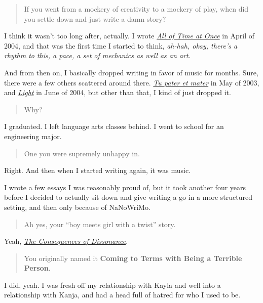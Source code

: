 \begin{quote}
If you went from a mockery of creativity to a mockery of play, when did you settle down and just write a damn story?
\end{quote}

I think it wasn't too long after, actually. I wrote \href{https://writing.drab-makyo.com/fiction/all-of-time-at-once/}{\emph{All of Time at Once}} in April of 2004, and that was the first time I started to think, \emph{ah-hah, okay, there's a rhythm to this, a pace, a set of mechanics as well as an art.}

And from then on, I basically dropped writing in favor of music for months. Sure, there were a few others scattered around there. \href{https://writing.drab-makyo.com/fiction/tu-pater-et-mater/}{\emph{Tu pater et mater}} in May of 2003, and \href{https://writing.drab-makyo.com/fiction/light/}{\emph{Light}} in June of 2004, but other than that, I kind of just dropped it.

\begin{quote}
Why?
\end{quote}

I graduated. I left language arts classes behind. I went to school for an engineering major.

\begin{quote}
One you were supremely unhappy in.
\end{quote}

Right. And then when I started writing again, it was music.

I wrote a few essays I was reasonably proud of, but it took another four years before I decided to actually sit down and give writing a go in a more structured setting, and then only because of NaNoWriMo.

\begin{quote}
Ah yes, your ``boy meets girl with a twist'' story.
\end{quote}

Yeah, \href{https://writing.drab-makyo.com/fiction/consequences-of-dissonance/}{\emph{The Consequences of Dissonance}}.

\begin{quote}
You originally named it \textbf{Coming to Terms with Being a Terrible Person}.
\end{quote}

I did, yeah. I was fresh off my relationship with Kayla and well into a relationship with Kanja, and had a head full of hatred for who I used to be.

